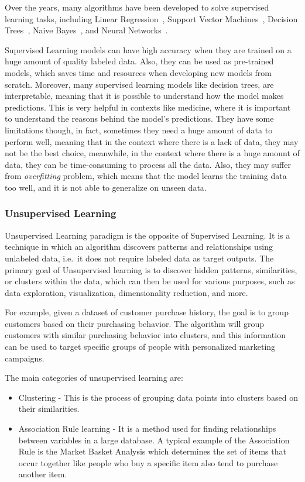 Over the years, many algorithms have been developed to solve supervised learning tasks, including Linear Regression~\citep{james2013introduction}, Support Vector Machines~\citep{cortes1995support}, Decision Trees~\citep{breiman2017classification}, Naive Bayes~\citep{mccallum1998comparison}, and Neural Networks~\citep{lecun1998gradient}.

Supervised Learning models can have high accuracy when they are trained on a huge amount of quality labeled data.
Also, they can be used as pre-trained models, which saves time and resources when developing new models from scratch.
Moreover, many supervised learning models like decision trees, are interpretable, meaning that it is possible to understand how the model makes predictions.
This is very helpful in contexts like medicine, where it is important to understand the reasons behind the model's predictions.
They have some limitations though, in fact, sometimes they need a huge amount of data to perform well, meaning that in the context where there is a lack of data, they may not be the best choice, meanwhile, in the context where there is a huge amount of data, they can be time-consuming to process all the data.
Also, they may suffer from \textit{overfitting} problem, which means that the model learns the training data too well, and it is not able to generalize on unseen data.


\subsubsection{Unsupervised Learning}
\label{subsubsec:unsupervised_ml}
Unsupervised Learning paradigm is the opposite of Supervised Learning.
It is a technique in which an algorithm discovers patterns and relationships using unlabeled data, i.e.\ it does not require labeled data as target outputs.
The primary goal of Unsupervised learning is to discover hidden patterns, similarities, or clusters within the data, which can then be used for various purposes, such as data exploration, visualization, dimensionality reduction, and more.

For example, given a dataset of customer purchase history, the goal is to group customers based on their purchasing behavior.
The algorithm will group customers with similar purchasing behavior into clusters, and this information can be used to target specific groups of people with personalized marketing campaigns.

The main categories of unsupervised learning are:
\begin{itemize}
    \item Clustering - This is the process of grouping data points into clusters based on their similarities.

    \item Association Rule learning - It is a method used for finding relationships between variables in a large database.
    A typical example of the Association Rule is the Market Basket Analysis which determines the set of items that occur together like people who buy a specific item also tend to purchase another item.

\end{itemize}

